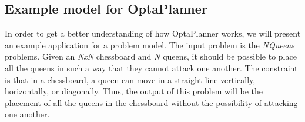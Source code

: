 \subsection{Example model for OptaPlanner}
In order to get a better understanding of how OptaPlanner works, we will present an example application for a problem model. The input problem is the \textit{NQueens} problems.
Given an \textit{NxN} chessboard and \textit{N} queens, it should be possible to place all the queens in such a way that they cannot attack one another. The constraint is that in a chessboard, a queen can move in a straight line vertically, horizontally, or diagonally. 
Thus, the output of this problem will be the placement of all the queens in the chessboard without the possibility of attacking one another.